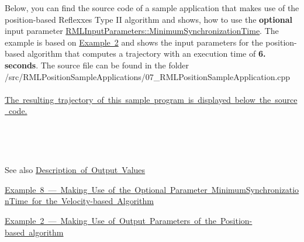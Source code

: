 Below, you can find the source code of a sample application that makes use of the position-\/based Reflexxes Type II algorithm and shows, how to use the {\bfseries{optional}} input parameter \mbox{\hyperlink{classRMLInputParameters_a293077b01e48af1657edd8765732c836}{R\+M\+L\+Input\+Parameters\+::\+Minimum\+Synchronization\+Time}}. The example is based on \mbox{\hyperlink{page_Code_02_RMLPositionSampleApplication}{Example 2}} and shows the input parameters for the position-\/based algorithm that computes a trajectory with an execution time of {\bfseries{6. seconds}}. The source file can be found in the folder~\newline
~\newline
{\ttfamily /src/\+R\+M\+L\+Position\+Sample\+Applications/07\+\_\+\+R\+M\+L\+Position\+Sample\+Application.cpp}~\newline
~\newline
\mbox{\hyperlink{page_Code_07_RMLPositionSampleApplication_anc_PositionExample7}{The resulting trajectory of this sample program is displayed below the source code.}} ~\newline
~\newline
 
\begin{DoxyCodeInclude}{0}
\end{DoxyCodeInclude}


~\newline
~\newline
\label{page_Code_07_RMLPositionSampleApplication_anc_PositionExample7}%
%
 

~\newline
~\newline
 \begin{DoxySeeAlso}{See also}
\mbox{\hyperlink{page_OutputValues}{Description of Output Values}} 

\mbox{\hyperlink{page_Code_08_RMLVelocitySampleApplication}{Example 8 --- Making Use of the Optional Parameter Minimum\+Synchronization\+Time for the Velocity-\/based Algorithm}} 

\mbox{\hyperlink{page_Code_02_RMLPositionSampleApplication}{Example 2 --- Making Use of Output Parameters of the Position-\/based algorithm}} 
\end{DoxySeeAlso}
